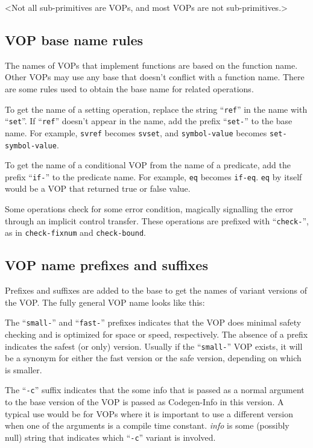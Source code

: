 \comment<Not all sub-primitives are VOPs, and most VOPs are not sub-primitives.>



\subsection{VOP base name rules}

The names of VOPs that implement functions are based on the function name.
Other VOPs may use any base that doesn't conflict with a function name.  There
are some rules used to obtain the base name for related operations.

To get the name of a setting operation, replace the string ``{\tt ref}'' in the name
with ``{\tt set}''.  If ``{\tt ref}'' doesn't appear in the name, add the prefix ``{\tt set-}'' to the
base name.  For example, {\tt svref} becomes {\tt svset}, and {\tt symbol-value}
becomes {\tt set-symbol-value}.

To get the name of a conditional VOP from the name of a predicate, add the
prefix ``{\tt if-}'' to the predicate name.  For example, {\tt eq} becomes {\tt if-eq}.
{\tt eq} by itself would be a VOP that returned true or false value.

Some operations check for some error condition, magically signalling the error
through an implicit control transfer.  These operations are prefixed with
``{\tt check-}'', as in {\tt check-fixnum} and {\tt check-bound}.



\subsection{VOP name prefixes and suffixes}

Prefixes and suffixes are added to the base to get the names of variant
versions of the VOP.  The fully general VOP name looks like this:
\begin{format}
   {``{\tt small-}'' | ``{\tt fast-}''} {\it name}{``{\tt -c}'' {\it info}}{``{\tt /}'' {\it type}{``{\tt =>}'' {\it result-type}}
\end{format}
The ``{\tt small-}'' and ``{\tt fast-}'' prefixes indicates that the VOP does minimal
safety checking and is optimized for space or speed, respectively.  The absence
of a prefix indicates the safest (or only) version.  Usually if the ``{\tt small-}''
VOP exists, it will be a synonym for either the fast version or the safe
version, depending on which is smaller.

The ``{\tt -c}'' suffix indicates that the some info that is passed as a normal
argument to the base version of the VOP is passed as Codegen-Info in this
version.  A typical use would be for VOPs where it is important to use a
different version when one of the arguments is a compile time constant.
{\it info} is some (possibly null) string that indicates which ``{\tt -c}'' variant
is involved.

